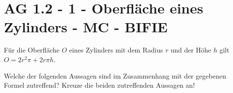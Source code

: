 \section{AG 1.2 - 1 - Oberfläche eines Zylinders - MC - BIFIE}

\begin{beispiel}[AG 1.2]{1} %
				Für die Oberfläche $O$ eines Zylinders mit dem Radius $r$ und der Höhe $h$ gilt $O=2r^2\pi+2r\pi h$.
				
				Welche der folgenden Aussagen sind im Zusammenhang mit der gegebenen Formel zutreffend? Kreuze die beiden zutreffenden Aussagen an!
\end{beispiel}